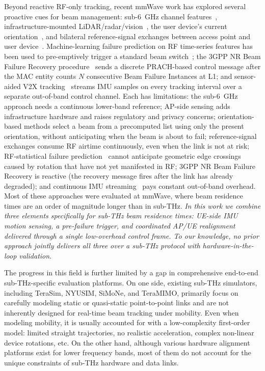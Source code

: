 \documentclass[fleqn,10pt]{wlscirep}
\newcommand{\rev}[1]{{\color{revblue}#1}}
\begin{document}
\rev{Beyond reactive RF-only tracking, recent mmWave work has explored several proactive cues for beam management: sub-6~GHz channel features~\cite{Alrabeiah2020DeepLearning}, infrastructure-mounted LiDAR/radar/vision~\cite{Alkhateeb2023DeepSense, Jiang2023LiDAR, Morais2023Position}, the user device's current orientation~\cite{Rezaie2022Orientation, Struye2023CoVRage}, and bilateral reference-signal exchanges between access point and user device~\cite{Alkhateeb2018DLCB, Xue2023Standardization, Heng2021SixChallenges}. Machine-learning failure prediction on RF time-series features has been used to pre-emptively trigger a standard beam switch~\cite{9838772}; the 3GPP NR Beam Failure Recovery procedure~\cite{Giordani2018ATO, Heng2021SixChallenges} sends a discrete PRACH-based control message after the MAC entity counts $N$ consecutive Beam Failure Instances at L1; and sensor-aided V2X tracking~\cite{Brambilla_2019} streams IMU samples on every tracking interval over a separate out-of-band control channel. Each has limitations: the sub-6~GHz approach needs a continuous lower-band reference; AP-side sensing adds infrastructure hardware and raises regulatory and privacy concerns; orientation-based methods select a beam from a precomputed list using only the present orientation, without anticipating when the beam is about to fail; reference-signal exchanges consume RF airtime continuously, even when the link is not at risk; RF-statistical failure prediction~\cite{9838772} cannot anticipate geometric edge crossings caused by rotation that have not yet manifested in RF; 3GPP NR Beam Failure Recovery is reactive (the recovery message fires after the link has already degraded); and continuous IMU streaming~\cite{Brambilla_2019} pays constant out-of-band overhead. Most of these approaches were evaluated at mmWave, where beam residence times are an order of magnitude longer than in sub-THz. \emph{In this work we combine three elements specifically for sub-THz beam residence times: UE-side IMU motion sensing, a pre-failure trigger, and coordinated AP/UE realignment delivered through a single low-overhead control frame. To our knowledge, no prior approach jointly delivers all three over a sub-THz protocol with hardware-in-the-loop validation.}}

The progress in this field is further limited by a gap in comprehensive end-to-end sub-THz-specific evaluation platforms. On one side, existing sub-THz simulators, including TeraSim\cite{HOSSAIN2019100004}, NYUSIM\cite{10367974}, SiMoNe\cite{rose2015simone, eckhardt2022modular}, and TeraMIMO\cite{tarboush2021teramimo, bodet2023directional}, primarily focus on carefully modeling static or quasi-static point-to-point links and are not inherently designed for real-time beam tracking under mobility\cite{Petrov2023Mobile}. Even when modeling mobility, it is usually accounted for with a low-complexity first-order model: limited straight trajectories, no realistic acceleration, complex non-linear device rotations, etc. On the other hand, although various hardware alignment platforms exist for lower frequency bands\cite{Abdulwahab2020, Keshavamurthy2022, AlAkkoumi2008}, most of them do not account for the unique constraints of sub-THz hardware and data links.
\end{document}
